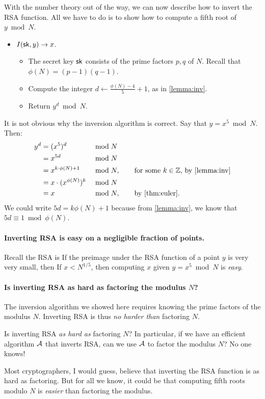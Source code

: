 With the number theory out of the way, we can now describe how
to invert the RSA function.
All we have to do is to show how to compute a fifth root of $y \bmod N$.

\begin{itemize}
  \item $I({\mathsf{sk}}, y) \to x$.
\begin{itemize}
  \item The secret key ${\mathsf{sk}}$ consists of the prime factors $p,q$ of $N$.
        Recall that $\phi(N) = (p-1)(q-1)$.
  \item Compute the integer $d \gets \frac{\phi(N) - 4}{5} + 1$, as in
    \cref{lemma:inv}.

  \item Return $y^d \bmod N$.
\end{itemize}
\end{itemize}

It is not obvious why the inversion algorithm is correct.
Say that $y = x^5 \bmod N$.
Then:
\begin{align*}
  y^d &= (x^5)^d &&\bmod N\\
      &= x^{5d} &&\bmod N\\
&= x^{k \cdot \phi(N) + 1} &&\bmod N, \qquad \text{for some $k \in \Z$, by \cref{lemma:inv}}\\
        &= x \cdot (x^{\phi(N)})^k &&\bmod N\\
&= x &&\bmod N, \qquad\text{by \cref{thm:euler}}.\\
\end{align*}
We could write $5d = k \phi(N) + 1$ because from \cref{lemma:inv},
we know that $5d \equiv 1 \bmod \phi(N)$.

\paragraph{Inverting RSA is easy on a negligible fraction of points.}
Recall the RSA is 
If the preimage under the RSA function of a point $y$ is very very small,
then 
If $x < N^{1/5}$, then computing $x$ given $y = x^5 \bmod N$ is \emph{easy}.


\paragraph{Is inverting RSA as hard as factoring the modulus $N$?}
The inversion algorithm we showed here requires knowing the prime factors
of the modulus $N$.
Inverting RSA is thus \emph{no harder than} factoring $N$.

Is inverting RSA \emph{as hard as} factoring $N$?
In particular, if we have an efficient algorithm $\mathcal{A}$ that inverts
RSA, can we use $\mathcal{A}$ to factor the modulus $N$?
No one knows!

Most cryptographers, I would guess, believe that inverting the RSA function
is as hard as factoring.
But for all we know, it could be that computing fifth roots modulo $N$ is \emph{easier}
than factoring the modulus.


